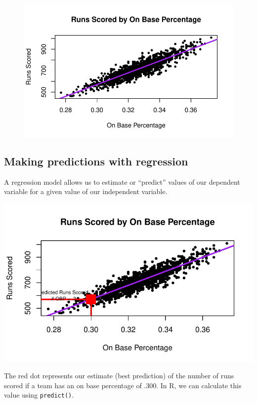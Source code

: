 \documentclass[
  letterpaper,
  DIV=11,
  numbers=noendperiod]{scrreprt}
\begin{document}
\begin{figure}[H]

{\centering \includegraphics{08-Regression_files/figure-pdf/unnamed-chunk-9-1.pdf}

}

\end{figure}

\hypertarget{making-predictions-with-regression}{%
\subsection{Making predictions with
regression}\label{making-predictions-with-regression}}

A regression model allows us to estimate or ``predict'' values of our
dependent variable for a given value of our independent variable.

\includegraphics{08-Regression_files/figure-pdf/unnamed-chunk-10-1.pdf}

The red dot represents our estimate (best prediction) of the number of
runs scored if a team has an on base percentage of .300. In R, we can
calculate this value using \texttt{predict()}.
\end{document}
